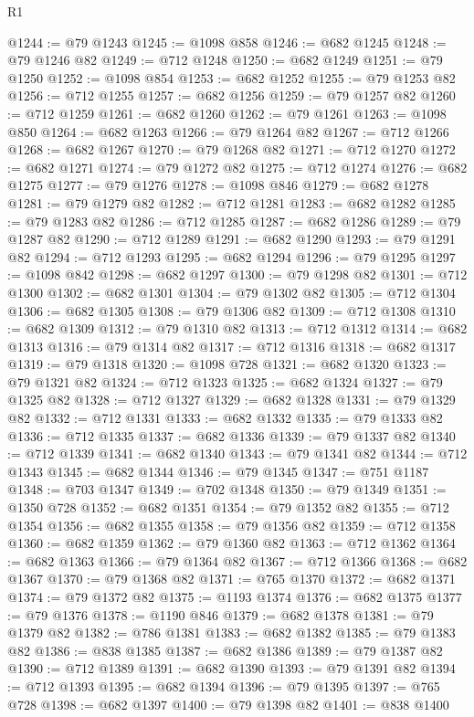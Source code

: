 \begin{lexlean}{R1}
\begin{coremodule}
@1244 := @79 @1243
@1245 := @1098 @858
@1246 := @682 @1245
@1248 := @79 @1246 @82
@1249 := @712 @1248
@1250 := @682 @1249
@1251 := @79 @1250
@1252 := @1098 @854
@1253 := @682 @1252
@1255 := @79 @1253 @82
@1256 := @712 @1255
@1257 := @682 @1256
@1259 := @79 @1257 @82
@1260 := @712 @1259
@1261 := @682 @1260
@1262 := @79 @1261
@1263 := @1098 @850
@1264 := @682 @1263
@1266 := @79 @1264 @82
@1267 := @712 @1266
@1268 := @682 @1267
@1270 := @79 @1268 @82
@1271 := @712 @1270
@1272 := @682 @1271
@1274 := @79 @1272 @82
@1275 := @712 @1274
@1276 := @682 @1275
@1277 := @79 @1276
@1278 := @1098 @846
@1279 := @682 @1278
@1281 := @79 @1279 @82
@1282 := @712 @1281
@1283 := @682 @1282
@1285 := @79 @1283 @82
@1286 := @712 @1285
@1287 := @682 @1286
@1289 := @79 @1287 @82
@1290 := @712 @1289
@1291 := @682 @1290
@1293 := @79 @1291 @82
@1294 := @712 @1293
@1295 := @682 @1294
@1296 := @79 @1295
@1297 := @1098 @842
@1298 := @682 @1297
@1300 := @79 @1298 @82
@1301 := @712 @1300
@1302 := @682 @1301
@1304 := @79 @1302 @82
@1305 := @712 @1304
@1306 := @682 @1305
@1308 := @79 @1306 @82
@1309 := @712 @1308
@1310 := @682 @1309
@1312 := @79 @1310 @82
@1313 := @712 @1312
@1314 := @682 @1313
@1316 := @79 @1314 @82
@1317 := @712 @1316
@1318 := @682 @1317
@1319 := @79 @1318
@1320 := @1098 @728
@1321 := @682 @1320
@1323 := @79 @1321 @82
@1324 := @712 @1323
@1325 := @682 @1324
@1327 := @79 @1325 @82
@1328 := @712 @1327
@1329 := @682 @1328
@1331 := @79 @1329 @82
@1332 := @712 @1331
@1333 := @682 @1332
@1335 := @79 @1333 @82
@1336 := @712 @1335
@1337 := @682 @1336
@1339 := @79 @1337 @82
@1340 := @712 @1339
@1341 := @682 @1340
@1343 := @79 @1341 @82
@1344 := @712 @1343
@1345 := @682 @1344
@1346 := @79 @1345
@1347 := @751 @1187
@1348 := @703 @1347
@1349 := @702 @1348
@1350 := @79 @1349
@1351 := @1350 @728
@1352 := @682 @1351
@1354 := @79 @1352 @82
@1355 := @712 @1354
@1356 := @682 @1355
@1358 := @79 @1356 @82
@1359 := @712 @1358
@1360 := @682 @1359
@1362 := @79 @1360 @82
@1363 := @712 @1362
@1364 := @682 @1363
@1366 := @79 @1364 @82
@1367 := @712 @1366
@1368 := @682 @1367
@1370 := @79 @1368 @82
@1371 := @765 @1370
@1372 := @682 @1371
@1374 := @79 @1372 @82
@1375 := @1193 @1374
@1376 := @682 @1375
@1377 := @79 @1376
@1378 := @1190 @846
@1379 := @682 @1378
@1381 := @79 @1379 @82
@1382 := @786 @1381
@1383 := @682 @1382
@1385 := @79 @1383 @82
@1386 := @838 @1385
@1387 := @682 @1386
@1389 := @79 @1387 @82
@1390 := @712 @1389
@1391 := @682 @1390
@1393 := @79 @1391 @82
@1394 := @712 @1393
@1395 := @682 @1394
@1396 := @79 @1395
@1397 := @765 @728
@1398 := @682 @1397
@1400 := @79 @1398 @82
@1401 := @838 @1400

\end{coremodule}
\end{lexlean}
